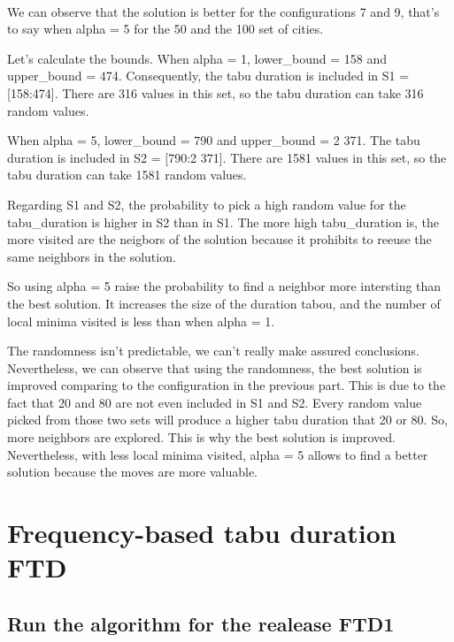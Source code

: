 \documentclass[12pt,oneside,a4paper]{article}
\begin{document}
\paragraph{}
We can observe that the solution is better for the configurations 7 and 9, that's to say when
alpha = 5 for the 50 and the 100 set of cities.

Let's calculate the bounds.
When alpha = 1, lower\_bound = 158 and upper\_bound = 474.
Consequently, the tabu duration is included in S1 = [158:474].
There are 316 values in this set, so the tabu duration can take 316 random values.

When alpha = 5, lower\_bound = 790 and upper\_bound = 2 371.
The tabu duration is included in S2 = [790:2 371].
There are 1581 values in this set, so the tabu duration can take 1581 random values.

Regarding S1 and S2, the probability to pick a high random value for the tabu\_duration is higher in S2 than in S1.
The more high tabu\_duration is, the more visited are the neigbors of the solution because it prohibits to reeuse the
same neighbors in the solution.

So using alpha = 5 raise the probability to find a neighbor more intersting than the best solution.
It increases the size of the duration tabou, and the number of local minima visited is less than when
alpha = 1.

The randomness isn’t predictable, we can’t really make assured conclusions.
Nevertheless, we can observe that using the randomness, the best solution is improved comparing to the configuration
in the previous part. This is due to the fact that 20 and 80 are not even included in S1 and S2.
Every random value picked from those two sets will produce a higher tabu duration that 20 or 80.
So, more neighbors are explored. This is why the best solution is improved.
Nevertheless, with less local minima visited, alpha = 5 allows to find a better solution because the moves are
more valuable.


\newpage
\section{Frequency-based tabu duration FTD}

\subsection{Run the algorithm for the realease FTD1}
\end{document}
